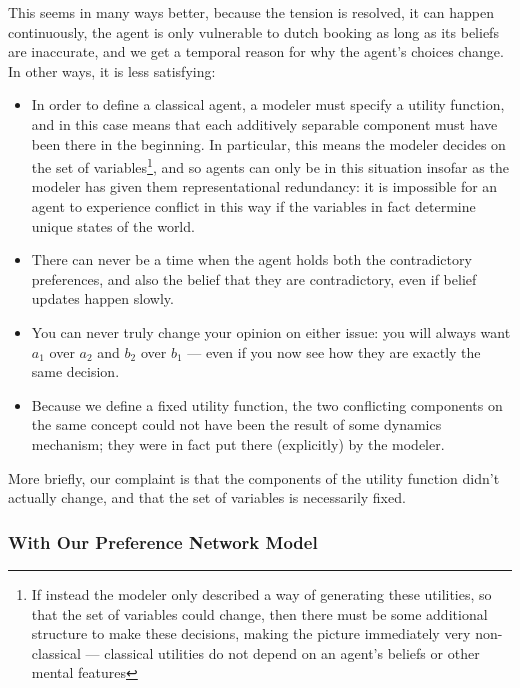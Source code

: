 \documentclass{article}
\begin{document}
	This seems in many ways better, because the tension is resolved, it can happen continuously, the agent is only vulnerable to dutch booking as long as its beliefs are inaccurate, and we get a temporal reason for why the agent's choices change. In other ways, it is less satisfying:
	\begin{itemize}%
		\item In order to define a classical agent, a modeler must specify a utility function, and in this case means that each additively separable component must have been there in the beginning. In particular, this means the modeler decides on the set of variables\footnote{If instead the modeler only described a way of generating these utilities, so that the set of variables could change, then there must be some additional structure to make these decisions, making the picture immediately very non-classical --- classical utilities do not depend on an agent's beliefs or other mental features}, and so agents can only be in this situation insofar as the modeler has given them representational redundancy: it is impossible for an agent to experience conflict in this way if the variables in fact determine unique states of the world.
		
		\item There can never be a time when the agent holds both the contradictory preferences, and also the belief that they are contradictory, even if belief updates happen slowly.		
		
		\item You can never truly change your opinion on either issue: you will always want $a_1$ over $a_2$ and $b_2$ over $b_1$ --- even if you now see how they are exactly the same decision.
		
		\item Because we define a fixed utility function, the two conflicting components on the same concept could not have been the result of some dynamics mechanism; they were in fact put there (explicitly) by the modeler. 
	\end{itemize}
	
	More briefly, our complaint is that the components of the utility function didn't actually change, and that the set of variables is necessarily fixed.
	
	\subsubsection{With Our Preference Network Model}
	
\end{document}
